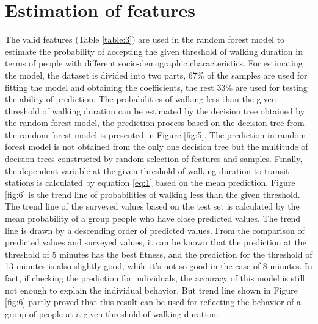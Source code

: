 \documentclass[Journal,letterpaper]{ascelike-new}
\begin{document}
\section{Estimation of features}
The valid features (Table \ref{table:3}) are used in the random forest model to estimate the probability of accepting the given threshold of walking duration in terms of people with different socio-demographic characteristics. For estimating the model, the dataset is divided into two parts, 67\% of the samples are used for fitting the model and obtaining the coefficients, the rest 33\% are used for testing the ability of prediction. The probabilities of walking less than the given threshold of walking duration can be estimated by the decision tree obtained by the random forest model, the prediction process based on the decision tree from the random forest model is presented in Figure \ref{fig:5}. The prediction in random forest model is not obtained from the only one decision tree but the multitude of decision trees constructed by random selection of features and samples. Finally, the dependent variable at the given threshold of walking duration to transit stations is calculated by equation \ref{eq:1} based on the mean prediction.
%
Figure \ref{fig:6} is the trend line of probabilities of walking less than the given threshold. The trend line of the surveyed values based on the test set is calculated by the mean probability of a group people who have close predicted values. The trend line is drawn by a descending order of predicted values. From the comparison of predicted values and surveyed values, it can be known that the prediction at the threshold of 5 minutes has the best fitness, and the prediction for the threshold of 13 minutes is also slightly good, while it’s not so good in the case of 8 minutes. In fact, if checking the prediction for individuals, the accuracy of this model is still not enough to explain the individual behavior. But trend line shown in Figure \ref{fig:6} partly proved that this result can be used for reflecting the behavior of a group of people at a given threshold of walking duration.
%
\end{document}
